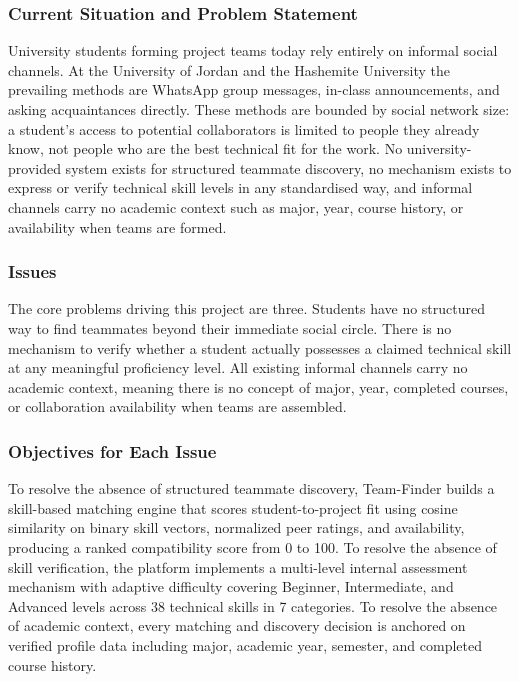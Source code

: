 \documentclass[12pt,a4paper]{article}
\begin{document}
\subsubsection{Current Situation and Problem Statement}

University students forming project teams today rely entirely on informal social channels.
At the University of Jordan and the Hashemite University the prevailing methods are
WhatsApp group messages, in-class announcements, and asking acquaintances directly.
These methods are bounded by social network size: a student's access to potential
collaborators is limited to people they already know, not people who are the best
technical fit for the work. No university-provided system exists for structured teammate
discovery, no mechanism exists to express or verify technical skill levels in any
standardised way, and informal channels carry no academic context such as major, year,
course history, or availability when teams are formed.

\subsubsection{Issues}

The core problems driving this project are three. Students have no structured way to find
teammates beyond their immediate social circle. There is no mechanism to verify whether a
student actually possesses a claimed technical skill at any meaningful proficiency level.
All existing informal channels carry no academic context, meaning there is no concept of
major, year, completed courses, or collaboration availability when teams are assembled.

\subsubsection{Objectives for Each Issue}

To resolve the absence of structured teammate discovery, Team-Finder builds a skill-based
matching engine that scores student-to-project fit using cosine similarity on binary skill
vectors, normalized peer ratings, and availability, producing a ranked compatibility score
from 0 to 100. To resolve the absence of skill verification, the platform implements a
multi-level internal assessment mechanism with adaptive difficulty covering Beginner,
Intermediate, and Advanced levels across 38 technical skills in 7 categories. To resolve
the absence of academic context, every matching and discovery decision is anchored on
verified profile data including major, academic year, semester, and completed course history.
\end{document}
